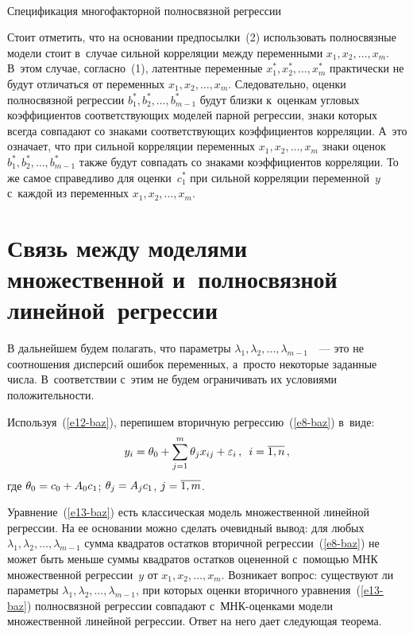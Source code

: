\begin{multicols}{2}
{ \begin{center}  %
 \vspace*{12pt}
   \mbox{%
 \epsfxsize=79mm 
 }

\end{center}

\vspace*{3pt}

\noindent
 {\small Спецификация многофакторной полносвязной регрессии}
 }


    
    Стоит отметить, что на основании предпосылки~(2) использовать 
полносвязные модели стоит в~случае сильной корреляции между переменными 
$x_1, x_2, \ldots , x_m$. В~этом случае, согласно~(1), латентные переменные 
$x_1^*, x_2^*, \ldots , x_m^*$ практически не будут отличаться от переменных 
$x_1, x_2, \ldots , x_m$. Следовательно, оценки полносвязной регрессии $b_1^*, 
b_2^*, \ldots , b^*_{m-1}$ будут близки к~оценкам угловых коэффициентов 
соответствующих моделей парной регрессии, знаки которых всегда совпадают 
со знаками соответствующих коэффициентов корреляции. А~это означает, что 
при сильной корреляции переменных $x_1, x_2, \ldots , x_m$ знаки оценок  
$b_1^*, b_2^*, \ldots , b^*_{m-1}$ также будут совпадать со знаками 
коэффициентов корреляции. То же самое справедливо для оценки~$c_1^*$ при 
сильной корреляции переменной~$y$ с~каждой из переменных $x_1, x_2, \ldots 
, x_m$.

\section{Связь между моделями множественной 
и~полносвязной линейной~регрессии}

    В дальнейшем будем полагать, что параметры $\lambda_1, \lambda_2, \ldots 
, \lambda_{m-1}$~~--- это не соотношения дисперсий ошибок переменных, 
а~просто некоторые заданные числа. В~соответствии с~этим не будем 
ограничивать их условиями положительности.
    
Используя~(\ref{e12-baz}), перепишем вторичную регрессию~(\ref{e8-baz}) 
в~виде:
\begin{equation}
y_i=\theta_0 +\sum\limits_{j=1}^m \theta_j x_{ij} +\varepsilon_i\,,\enskip 
i=\overline{1,n}\,, 
    \label{e13-baz}
    \end{equation}
где $\theta_0=c_0\hm+ A_0c_1$; $\theta_j\hm= A_j c_1$, $j\hm= \overline{1,m}$.
    
    Уравнение~(\ref{e13-baz}) есть классическая модель множественной 
линейной регрессии. На ее основании можно сделать очевидный вывод: для 
любых $\lambda_1, \lambda_2, \ldots , \lambda_{m-1}$ сумма квадратов остатков 
вторичной  
регрессии~(\ref{e8-baz}) не может быть меньше суммы квадратов остатков 
оцененной с~помощью МНК множественной регрессии~$y$ от $x_1, x_2, \ldots 
, x_m$. Возникает вопрос: существуют ли параметры $\lambda_1, \lambda_2, 
\ldots , \lambda_{m-1}$, при которых оценки вторичного 
уравнения~(\ref{e13-baz}) полносвязной регрессии совпадают  
с~МНК-оцен\-ка\-ми модели множественной линейной регрессии. Ответ на 
него дает следующая теорема.
    

\end{multicols}

